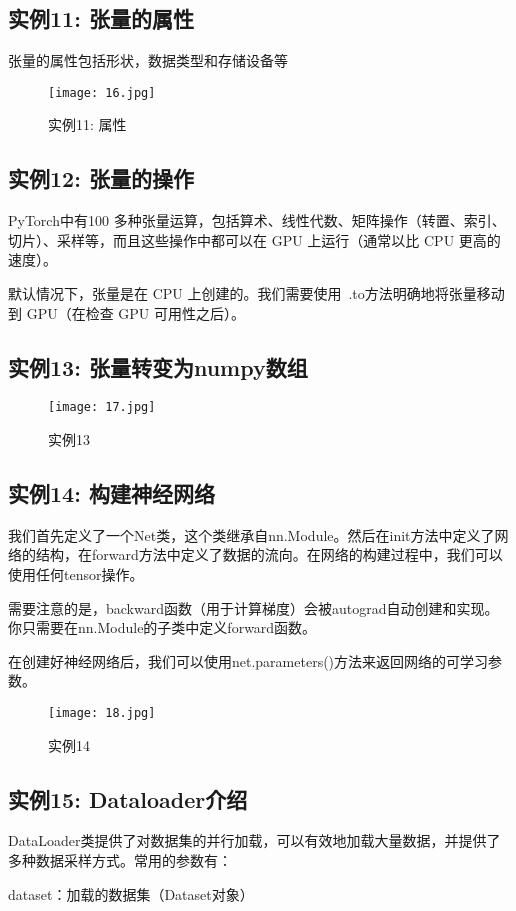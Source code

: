 \documentclass[a4paper, 12pt]{article}
\begin{document}
          \subsection{实例11: 张量的属性}
          张量的属性包括形状，数据类型和存储设备等
          \begin{figure}[h!]
            \centering
            \texttt{[image: 16.jpg]}
            \caption{实例11: 属性}
          \end{figure}
          \subsection{实例12: 张量的操作}
          PyTorch中有100 多种张量运算，包括算术、线性代数、矩阵操作（转置、索引、切片）、采样等，而且这些操作中都可以在 GPU 上运行（通常以比 CPU 更高的速度）。\par
默认情况下，张量是在 CPU 上创建的。我们需要使用 .to方法明确地将张量移动到 GPU（在检查 GPU 可用性之后）。
          \newpage
          \subsection{实例13: 张量转变为numpy数组}
          \begin{figure}[h!]
            \centering
            \texttt{[image: 17.jpg]}
            \caption{实例13}
          \end{figure}
          \subsection{实例14: 构建神经网络}
          我们首先定义了一个Net类，这个类继承自nn.Module。然后在init方法中定义了网络的结构，在forward方法中定义了数据的流向。在网络的构建过程中，我们可以使用任何tensor操作。\par
需要注意的是，backward函数（用于计算梯度）会被autograd自动创建和实现。你只需要在nn.Module的子类中定义forward函数。\par
在创建好神经网络后，我们可以使用net.parameters()方法来返回网络的可学习参数。\par
          \newpage
          \begin{figure}[h!]
            \centering
            \texttt{[image: 18.jpg]}
            \caption{实例14}
          \end{figure}
        \subsection{实例15: Dataloader介绍}
        \noindent DataLoader类提供了对数据集的并行加载，可以有效地加载大量数据，并提供了多种数据采样方式。常用的参数有：\par
dataset：加载的数据集（Dataset对象）\par
\end{document}
